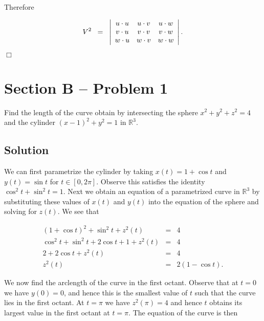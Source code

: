 \documentclass{article}
\begin{document}
\noindent Therefore

\begin{equation*}
V^2 \;\; = \;\; \left | \begin{array}{ccc}
u\cdot u & u\cdot v & u\cdot w \\
v\cdot u & v\cdot v & v\cdot w \\
w\cdot u & w\cdot v & w\cdot w \\
\end{array} \right |. \\
\end{equation*}

\noindent \hfill $\Box$


\section*{Section B -- Problem 1}

\noindent Find the length of the curve obtain by intersecting the sphere $x^2 +y^2 + z^2 =4$ and the cylinder $(x-1)^2 + y^2 = 1$ in $\mathbb{R}^3$.  

\subsection*{Solution}

\noindent We can first parametrize the cylinder by taking $x(t) = 1+ \cos t$ and $y(t) = \sin t$ for $t \in [0, 2\pi]$.  Observe this satisfies the identity $\cos^2t + \sin^2t = 1$.  Next we obtain an equation of a parametrized curve in $\mathbb{R}^3$ by substituting these values of $x(t)$ and $y(t)$ into the equation of the sphere and solving for $z(t)$.  We see that

\begin{eqnarray*}
(1+ \cos t)^2 + \sin^2t + z^2(t) & = & 4 \\
\cos^2t + \sin^2t + 2\cos t + 1 + z^2(t) & = & 4 \\
2 + 2\cos t + z^2(t) & = & 4 \\
z^2(t) & = & 2(1 - \cos t).
\end{eqnarray*}

\noindent We now find the arclength of the curve in the first octant.  Observe that at $t= 0$ we have $y(0) = 0$, and hence this is the smallest value of $t$ such that the curve lies in the first octant.  At $t = \pi$ we have $z^2(\pi) = 4$ and hence $t$ obtains its largest value in the first octant at $t = \pi$.  The equation of the curve is then 
\end{document}
